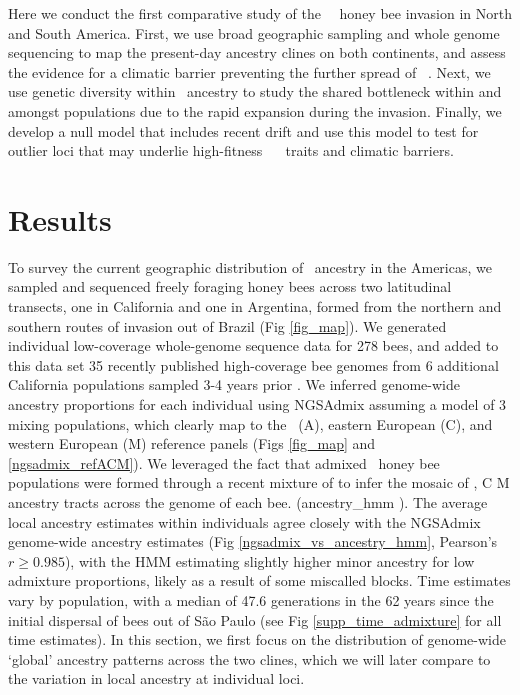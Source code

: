 Here we conduct the first comparative study of the \africanized\ \hyb\ honey bee invasion in North and South America. First, we use broad geographic sampling and whole genome sequencing to map the present-day ancestry clines on both continents, and assess the evidence for a climatic barrier preventing the further spread of \scutellata\ \anc. Next, we use genetic diversity within \scutellata\ ancestry to study the shared bottleneck within and amongst populations due to the rapid expansion during the invasion. Finally, we develop a null model that includes recent drift and use this model to test for outlier loci that may underlie high-fitness \africanized\ \hyb\  traits and climatic barriers.

\section*{Results}

To survey the current geographic distribution of \scutellata\ ancestry in the Americas, we sampled and sequenced freely foraging honey bees across two latitudinal transects, one in California and one in Argentina, formed from the northern and southern routes of invasion out of Brazil (Fig \ref{fig_map}). We generated individual low-coverage whole-genome sequence data for 278 bees, and added to this data set 35 recently published high-coverage bee genomes from 6 additional California populations sampled 3-4 years prior \cite{Cridland:2018fx}. We inferred genome-wide ancestry proportions for each individual using NGSAdmix \cite{Skotte:2013fk} assuming a model of 3 mixing populations, which clearly map to the \scutellata\ (A), eastern European (C), and western European (M) reference panels (Figs \ref{fig_map} and \ref{ngsadmix_refACM}). We leveraged the fact that admixed \africanized\ honey bee populations were formed through a recent mixture of  to infer the mosaic of \A, C  M ancestry tracts across the genome of each bee.  (ancestry\_hmm \cite{CorbettDetig:2017gh}). The average local ancestry estimates within individuals agree closely with the NGSAdmix genome-wide ancestry estimates (Fig \ref{ngsadmix_vs_ancestry_hmm}, Pearson's $r \geq 0.985$), with the HMM estimating slightly higher minor ancestry for low admixture proportions, likely as a result of some miscalled blocks. Time estimates vary by population, with a median of 47.6 generations in the 62 years since the initial dispersal of  bees out of São Paulo (see Fig \ref{supp_time_admixture} for all time estimates). In this section, we first focus on the distribution of genome-wide ‘global' ancestry patterns across the two clines, which we will later compare to the variation in local ancestry at individual loci.

